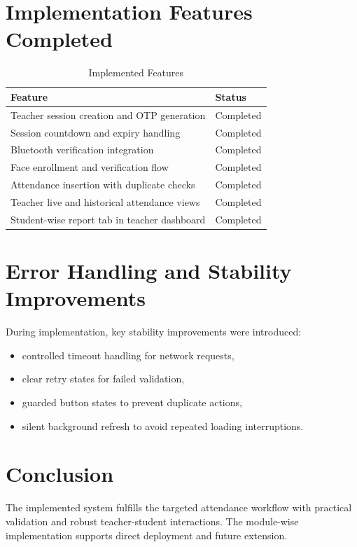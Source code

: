 \section{Implementation Features Completed}
\begin{table}[H]
\centering
\caption{Implemented Features}
\label{c5:tab2}
\begin{tabular}{|L{5.5cm}|L{4.8cm}|}
\hline
\textbf{Feature} & \textbf{Status}\\
\hline
Teacher session creation and OTP generation & Completed\\
\hline
Session countdown and expiry handling & Completed\\
\hline
Bluetooth verification integration & Completed\\
\hline
Face enrollment and verification flow & Completed\\
\hline
Attendance insertion with duplicate checks & Completed\\
\hline
Teacher live and historical attendance views & Completed\\
\hline
Student-wise report tab in teacher dashboard & Completed\\
\hline
\end{tabular}
\end{table}

\section{Error Handling and Stability Improvements}
During implementation, key stability improvements were introduced:
\begin{itemize}
\item controlled timeout handling for network requests,
\item clear retry states for failed validation,
\item guarded button states to prevent duplicate actions,
\item silent background refresh to avoid repeated loading interruptions.
\end{itemize}

\section{Conclusion}
The implemented system fulfills the targeted attendance workflow with practical validation and robust teacher-student interactions. The module-wise implementation supports direct deployment and future extension.

